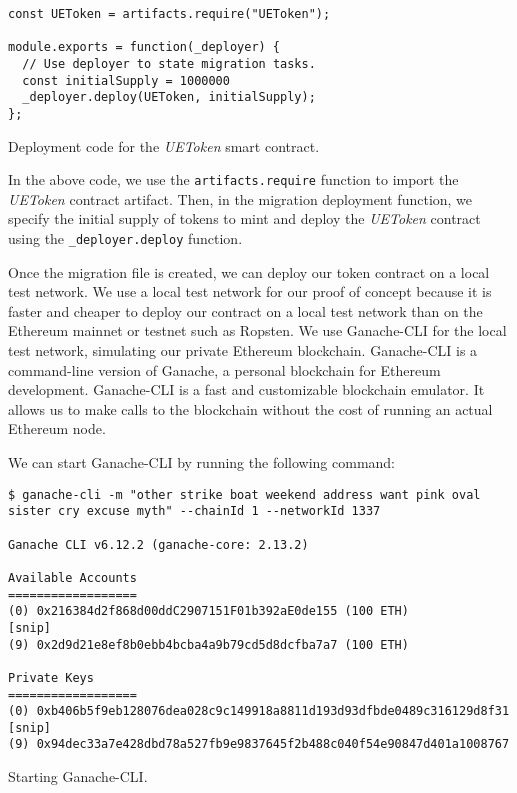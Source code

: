 \begin{listing}[H]
    \begin{verbatim}
const UEToken = artifacts.require("UEToken");

module.exports = function(_deployer) {
  // Use deployer to state migration tasks.
  const initialSupply = 1000000
  _deployer.deploy(UEToken, initialSupply);
};
    \end{verbatim}
    \caption{Deployment code for the \textit{UEToken} smart contract.}
    \label{lst:truffle_uetoken_migration}
\end{listing}

In the above code, we use the \texttt{artifacts.require} function to import the \textit{UEToken} contract artifact. Then, in the migration
deployment function, we specify the initial supply of tokens to mint and deploy the \textit{UEToken} contract using the \texttt{\_deployer.deploy} function.


Once the migration file is created, we can deploy our token contract on a local test network. We use a local test network for our proof of concept
because it is faster and cheaper to deploy our contract on a local test network than on the Ethereum mainnet or testnet such as Ropsten. 
We use Ganache-CLI \cite{trufflesuite_ganachecli} for the local test network, simulating our private Ethereum blockchain. Ganache-CLI is a command-line version of Ganache, a personal blockchain
for Ethereum development. Ganache-CLI is a fast and customizable blockchain emulator. It allows us to make calls to the blockchain without the cost of running an actual Ethereum node.


We can start Ganache-CLI by running the following command:

\begin{listing}[H]
    \begin{verbatim}
$ ganache-cli -m "other strike boat weekend address want pink oval sister cry excuse myth" --chainId 1 --networkId 1337 

Ganache CLI v6.12.2 (ganache-core: 2.13.2)

Available Accounts
==================
(0) 0x216384d2f868d00ddC2907151F01b392aE0de155 (100 ETH)
[snip]
(9) 0x2d9d21e8ef8b0ebb4bcba4a9b79cd5d8dcfba7a7 (100 ETH)

Private Keys
==================
(0) 0xb406b5f9eb128076dea028c9c149918a8811d193d93dfbde0489c316129d8f31
[snip]
(9) 0x94dec33a7e428dbd78a527fb9e9837645f2b488c040f54e90847d401a1008767
    \end{verbatim}
    \caption{Starting Ganache-CLI.}
    \label{lst:ganache_cli}
\end{listing}

